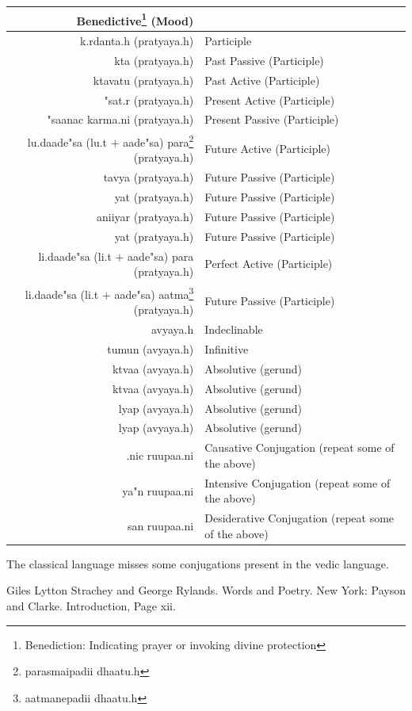 \documentclass[a4paper, 12pt]{article}
\newcommand \sans[1]{
    \textsanskrit{#1}
}
\begin{document}
\begin{table}[h!]
\begin{center}
\begin{longtable}{|r|l|}
    Benedictive\footnote{Benediction: Indicating prayer or invoking divine protection} (Mood) \\
    \hline
    \sans{k.rdanta.h (pratyaya.h)} &
    Participle\\
    \hline
    \sans{kta (pratyaya.h)} &
    Past Passive (Participle)\\
    \hline
    \sans{ktavatu (pratyaya.h)} &
    Past Active (Participle)\\
    \hline
    \sans{"sat.r (pratyaya.h)} &
    Present Active (Participle)\\
    \hline
    \sans{"saanac karma.ni (pratyaya.h)} &
    Present Passive (Participle)\\
    \hline
    \sans{lu.daade"sa (lu.t $+$ aade"sa) para\footnote{\sans{parasmaipadii dhaatu.h}} (pratyaya.h)} &
    Future Active (Participle)\\
    \hline
    \sans{tavya (pratyaya.h)} &
    Future Passive (Participle)\\
    \hline
    \sans{yat (pratyaya.h)} &
    Future Passive (Participle)\\
    \hline
    \sans{aniiyar (pratyaya.h)} &
    Future Passive (Participle)\\
    \hline
    \sans{yat (pratyaya.h)} &
    Future Passive (Participle)\\
    \hline
    \sans{li.daade"sa (li.t $+$ aade"sa) para (pratyaya.h)} &
    Perfect Active (Participle)\\
    \hline
    \sans{li.daade"sa (li.t $+$ aade"sa) aatma\footnote{\sans{aatmanepadii dhaatu.h}} (pratyaya.h)} &
    Future Passive (Participle)\\
    \hline
    \sans{avyaya.h}&
    Indeclinable\\
    \hline
    \sans{tumun (avyaya.h)} &
    Infinitive\\
    \hline
    \sans{ktvaa (avyaya.h)} &
    Absolutive (gerund)\\
    \hline
    \sans{ktvaa (avyaya.h)} &
    Absolutive (gerund)\\
    \hline
    \sans{lyap (avyaya.h)} &
    Absolutive (gerund)\\
    \hline
    \sans{lyap (avyaya.h)} &
    Absolutive (gerund)\\
    \hline
    \sans{.nic ruupaa.ni} &
    Causative Conjugation (repeat some of the above)\\
    \hline
    \sans{ya"n ruupaa.ni} &
    Intensive Conjugation (repeat some of the above)\\
    \hline
    \sans{san ruupaa.ni} &
    Desiderative Conjugation (repeat some of the above)\\
    \hline
\end{longtable}
\end{center}
\end{table}

The classical language misses some conjugations present in the vedic language.


\begin{thebibliography}{00}
     Giles Lytton Strachey and George Rylands. Words and Poetry. New York: Payson and Clarke. Introduction, Page xii.
\end{thebibliography}
\end{document}
